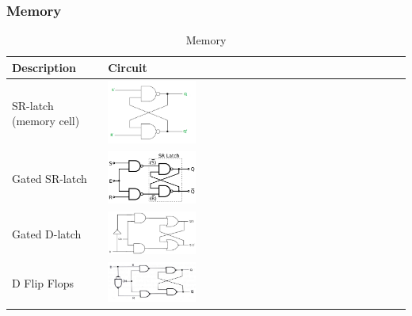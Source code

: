\subsubsection{Memory}
\begin{table}[h!]
    \centering
    \begin{tabular}{ | m{5cm} | m{5cm} | }
        \hline
        Description & Circuit \\
        \hline
        SR-latch (memory cell)    
        &
        \includegraphics[width=0.3\textwidth]{image/SR_latch.png} \\
        \hline
        Gated SR-latch
        &
        \includegraphics[width=0.3\textwidth]{image/Gated_SR_Latch.png} \\
        \hline
        Gated D-latch
        &
        \includegraphics[width=0.3\textwidth]{image/Gated_D_latch.png} \\
        \hline
        D Flip Flops
        &
        \includegraphics[width=0.3\textwidth]{image/D_Flip_Flop.png} \\
        \hline
    \end{tabular}
    \caption{Memory }\label{tbl:memory}
\end{table}

\newpage
